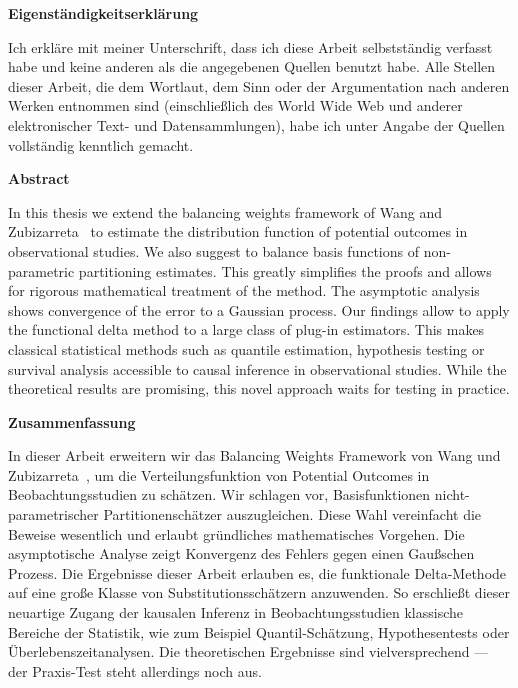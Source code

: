 \documentclass[11pt, a4paper, BCOR=7mm, DIV=11]{scrbook}
\theoremstyle{definition}
\theoremstyle{plain}
\begin{document}
\newpage
\begin{center}
\textbf{
Eigenständigkeitserklärung
}
\end{center}
Ich erkläre mit meiner Unterschrift,
dass ich diese Arbeit selbstständig verfasst habe und keine
anderen als die angegebenen Quellen benutzt habe.
Alle Stellen dieser Arbeit, die dem Wortlaut,
dem Sinn oder der Argumentation nach anderen Werken entnommen sind 
(einschließlich des World
Wide Web und anderer elektronischer Text- und Datensammlungen), habe ich unter Angabe der
Quellen vollständig kenntlich gemacht.
\newpage
  \begin{center}
  \textbf{Abstract}
  \end{center}
  In this thesis we extend the balancing weights framework of
  Wang and Zubizarreta~\cite{Wang2019} to estimate the distribution function of potential outcomes in observational studies.
  We also suggest to balance basis functions of non-parametric partitioning estimates. 
  This greatly simplifies the proofs and allows for rigorous mathematical treatment of the method.
  The asymptotic analysis shows convergence of the error to a Gaussian process.
  Our findings allow to apply the functional delta method to a large class of plug-in estimators.
  This makes classical statistical methods such as quantile estimation, hypothesis testing or survival analysis accessible to causal inference in observational studies.
  While the theoretical results are promising, this novel approach waits for testing in practice.
\newpage
  \begin{center}
  \textbf{Zusammenfassung}
  \end{center}
  In dieser Arbeit erweitern wir das Balancing Weights Framework von
  Wang und Zubizarreta~\cite{Wang2019}, um die Verteilungsfunktion von Potential Outcomes in Beobachtungsstudien zu schätzen.
  Wir schlagen vor, Basisfunktionen nicht-parametrischer 
  Partitionenschätzer
  auszugleichen.
  Diese Wahl vereinfacht die Beweise wesentlich und erlaubt gründliches mathematisches Vorgehen.
  Die asymptotische Analyse zeigt Konvergenz des Fehlers gegen einen Gaußschen Prozess.
  Die Ergebnisse dieser Arbeit erlauben es, die funktionale Delta-Methode auf eine große Klasse von Substitutionsschätzern anzuwenden.
  So erschließt dieser neuartige Zugang der kausalen Inferenz in Beobachtungsstudien klassische Bereiche der Statistik, wie zum Beispiel Quantil-Schätzung, Hypothesentests oder Überlebenszeitanalysen.
  Die theoretischen Ergebnisse sind vielversprechend --- der Praxis-Test steht allerdings noch aus.
\tableofcontents 
\mainmatter
{}
\end{document}
